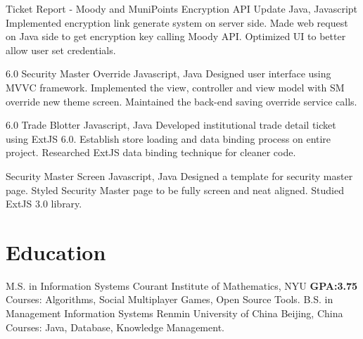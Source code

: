 \documentclass[11pt,a4paper,sans]{moderncv}   %
\begin{document}
{Ticket Report - Moody and MuniPoints Encryption API Update}
{Java, Javascript}
{}{}
{
	{Implemented encryption link generate system on server side.}
	\newline
	{Made web request on Java side to get encryption key calling Moody API.}
	\newline
	{Optimized UI to better allow user set credentials.}
}

{6.0 Security Master Override}
{Javascript, Java}
{}{}
{
	{Designed user interface using MVVC framework.}
	\newline
	{Implemented the view, controller and view model with SM override new theme screen.}
	\newline
	{Maintained the back-end saving override service calls.}
}

{6.0 Trade Blotter}
{Javascript, Java}
{}{}
{
	{Developed institutional trade detail ticket using ExtJS 6.0.}
	\newline
	{Establish store loading and data binding process on entire project.}
	\newline
	{Researched ExtJS data binding technique for cleaner code.}
}

\renewcommand{\baselinestretch}{1.25}

{Security Master Screen}
{Javascript, Java}
{}{}
{
	{Designed a template for security master page.}
	\newline
	{Styled Security Master page to be fully screen and neat aligned.}
	\newline
	{Studied ExtJS 3.0 library.}
}

\renewcommand{\baselinestretch}{1.25}

\section{Education}
{M.S. in Information Systems}
{Courant Institute of Mathematics, NYU}
{}{\textbf{GPA:3.75}}
{Courses: Algorithms, Social Multiplayer Games, Open Source Tools.}
{B.S. in Management Information Systems}
{Renmin University of China}
{Beijing, China}
{}
{Courses: Java, Database, Knowledge Management.}

\closesection{}                   %
\renewcommand{\listitemsymbol}{-} %
\end{document}
